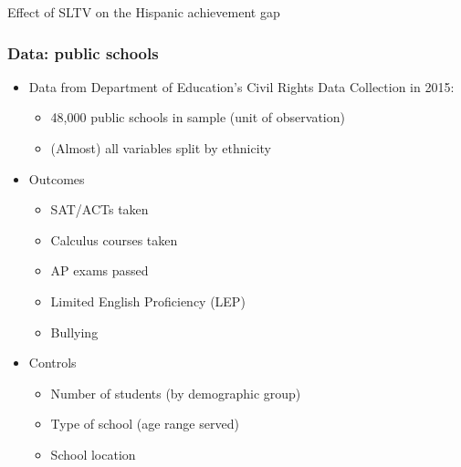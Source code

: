 \documentclass{beamer}
\begin{document}
\begin{frame}

\huge {\color{darkblue} Effect of SLTV on the Hispanic achievement gap}

\end{frame}



\begin{frame}
\frametitle{Data: public schools}
\begin{itemize}
\item Data from Department of Education's Civil Rights Data Collection in 2015:
\begin{itemize}
\item 48,000 public schools in sample (unit of observation)
\item (Almost) all variables split by ethnicity
\end{itemize}
\item Outcomes
\begin{itemize}
\item SAT/ACTs taken
\item Calculus courses taken
\item AP exams passed
\item Limited English Proficiency (LEP)
\item Bullying
\end{itemize}
\item Controls
\begin{itemize}
\item Number of students (by demographic group)
\item Type of school (age range served)
\item School location
\end{itemize}
\end{itemize}
\end{frame}
\end{document}
